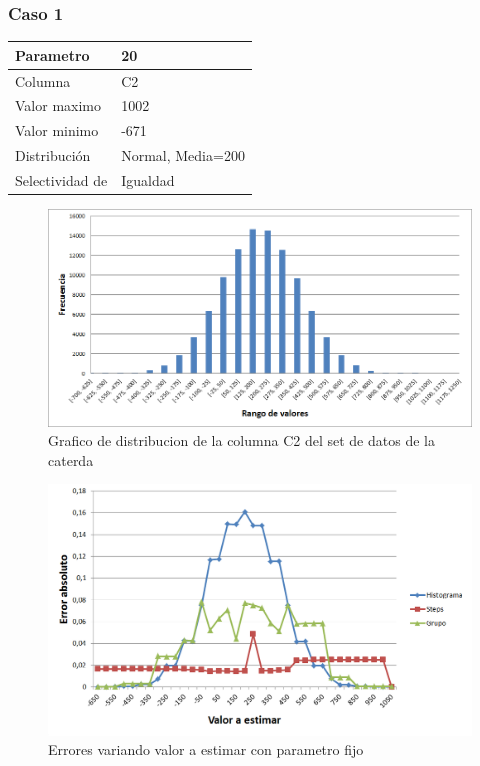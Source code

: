 		\subsubsection*{Caso 1}
		
		\begin{tabular}{| l | l |}
		\hline
		Parametro & 20 \\
		\hline
		Columna & C2 \\
		\hline
		Valor maximo & 1002 \\
		\hline
		Valor minimo & -671 \\
		\hline
		Distribuci\'on & Normal, Media=200 \\
		\hline
		Selectividad de & Igualdad \\
		\hline
		\end{tabular}

		\newpage					

	\begin{figure}[H]
	  \begin{center}
	    \includegraphics[scale=.40]{imagenes/distro_C2.png}
	    \caption{Grafico de distribucion de la columna C2 del set de datos de la caterda} 
	    \label{fig:(distro_C2}
	  \end{center}
	\end{figure}


	\begin{figure}[H]
	  \begin{center}
	    \includegraphics[scale=.40]{imagenes/C2_variando_valor.png}
	    \caption{Errores variando valor a estimar con parametro fijo} 
	    \label{fig:C2_variando_valor}
	  \end{center}
	\end{figure}
		
